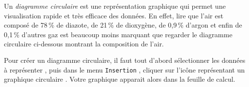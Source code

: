 Un \emph{diagramme circulaire} est une représentation graphique qui permet une visualisation rapide et très efficace des données. En effet, lire que l'air est composé de 78\,\% de diazote, de 21\,\% de dioxygène, de 0,9\,\% d'argon et enfin de 0,1\,\% d'autres gaz est beaucoup moins marquant que regarder le diagramme circulaire ci-dessous montrant la composition de l'air.


Pour créer un diagramme circulaire, il faut tout d'abord sélectionner les données à représenter , puis dans le menu \texttt{Insertion} , cliquer sur l'icône représentant un graphique circulaire . Votre graphique apparait alors dans la feuille de calcul.




